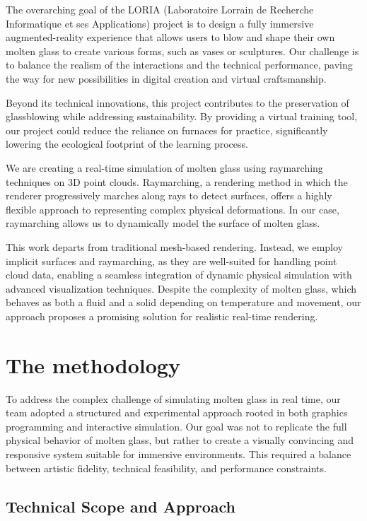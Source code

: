 \documentclass{rapportcs}
\begin{document}
    The overarching goal of the LORIA (Laboratoire Lorrain de Recherche Informatique et ses Applications) project is to design a fully immersive augmented-reality experience that allows users to blow and shape their own molten glass to create various forms, such as vases or sculptures. Our challenge is to balance the realism of the interactions and the technical performance, paving the way for new possibilities in digital creation and virtual craftsmanship.

    Beyond its technical innovations, this project contributes to the preservation of glassblowing while addressing sustainability. By providing a virtual training tool, our project could reduce the reliance on furnaces for practice, significantly lowering the ecological footprint of the learning process.

    We are creating a real-time simulation of molten glass using raymarching techniques on 3D point clouds. Raymarching, a rendering method in which the renderer progressively marches along rays to detect surfaces, offers a highly flexible approach to representing complex physical deformations. In our case, raymarching allows us to dynamically model the surface of molten glass.

    This work departs from traditional mesh-based rendering. Instead, we employ implicit surfaces and raymarching, as they are well-suited for handling point cloud data, enabling a seamless integration of dynamic physical simulation with advanced visualization techniques. Despite the complexity of molten glass, which behaves as both a fluid and a solid depending on temperature and movement, our approach proposes a promising solution for realistic real-time rendering.

    \newpage
    \section{The methodology}

To address the complex challenge of simulating molten glass in real time, our team adopted a structured and experimental approach rooted in both graphics programming and interactive simulation. Our goal was not to replicate the full physical behavior of molten glass, but rather to create a visually convincing and responsive system suitable for immersive environments. This required a balance between artistic fidelity, technical feasibility, and performance constraints.

\subsection{Technical Scope and Approach}
\end{document}
